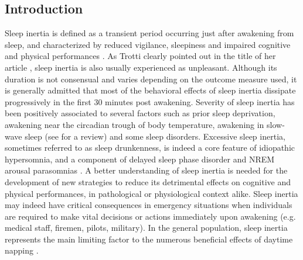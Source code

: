 
\subsection*{Introduction}
\label{res:inertia:inertia:intro}

Sleep inertia is defined as a transient period occurring just after awakening from sleep, and characterized by reduced vigilance, sleepiness and impaired cognitive and physical performances \citep{tassi_sleep_2000, trotti_waking_2016}. As Trotti clearly pointed out in the title of her article , sleep inertia is also usually experienced as unpleasant. Although its duration is not consensual and varies depending on the outcome measure used, it is generally admitted that most of the behavioral effects of sleep inertia dissipate progressively in the first 30 minutes post awakening. Severity of sleep inertia has been positively associated to several factors such as prior sleep deprivation, awakening near the circadian trough of body temperature, awakening in slow-wave sleep (see \citet{tassi_sleep_2000} for a review) and some sleep disorders. Excessive sleep inertia, sometimes referred to as sleep drunkenness, is indeed a core feature of idiopathic hypersomnia, and a component of delayed sleep phase disorder and NREM arousal parasomnias \citep{trotti_waking_2016}. A better understanding of sleep inertia is needed for the development of new strategies to reduce its detrimental effects on cognitive and physical performances, in pathological or physiological context alike. Sleep inertia may indeed have critical consequences in emergency situations when individuals are required to make vital decisions or actions immediately upon awakening (e.g. medical staff, firemen, pilots, military). In the general population, sleep inertia represents the main limiting factor to the numerous beneficial effects of daytime napping \citep{faraut_napping:_2016}.

